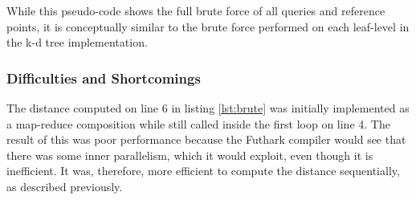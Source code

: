 While this pseudo-code shows the full brute force of all queries and reference points, it is conceptually similar to the brute force performed on each leaf-level in the k-d tree implementation. 


\subsubsection{Difficulties and Shortcomings}

The distance computed on line 6 in listing \ref{lst:brute} was initially implemented as a map-reduce composition while still called inside the first loop on line 4. The result of this was poor performance because the Futhark compiler would see that there was some inner parallelism, which it would exploit, even though it is inefficient. It was, therefore, more efficient to compute the distance sequentially, as described previously. 


























